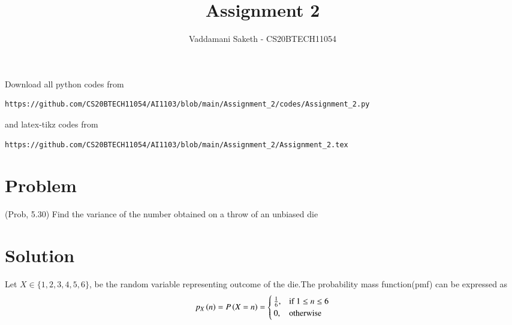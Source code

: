 \documentclass[journal,12pt,twocolumn]{IEEEtran}
\begin{document}
     \def\rightbox#1{\makebox[0in][r]{#1}}
     \def\centbox#1{\makebox[0in]{#1}}
     \def\topbox#1{\raisebox{-\baselineskip}[0in][0in]{#1}}
     \def\midbox#1{\raisebox{-0.5\baselineskip}[0in][0in]{#1}}
\vspace{3cm}
\title{Assignment 2}
\author{Vaddamani Saketh - CS20BTECH11054}
\maketitle
\newpage
\bigskip
\renewcommand{\thefigure}{\theenumi}
\renewcommand{\thetable}{\theenumi}
Download all python codes from 
\begin{lstlisting}
https://github.com/CS20BTECH11054/AI1103/blob/main/Assignment_2/codes/Assignment_2.py
\end{lstlisting}
%
and latex-tikz codes from 
%
\begin{lstlisting}
https://github.com/CS20BTECH11054/AI1103/blob/main/Assignment_2/Assignment_2.tex
\end{lstlisting}
\section{Problem}
(Prob, 5.30) Find the variance of the number obtained on a throw of an unbiased die
\section{Solution}
Let $X \in \{1,2,3,4,5,6\}$, be the random variable representing outcome of the die.The probability mass function(pmf) can be expressed as
\begin{align}
p_X\left(n\right) = P\left(X=n\right) =  \begin{cases}
			\frac{1}{6}, & \text{if $1 \leq n\leq 6$}\\
            0, & \text{otherwise}
		 \end{cases} 
\end{align}
\end{document}
